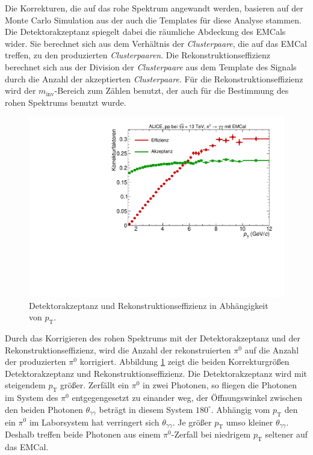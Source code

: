 Die Korrekturen, die auf das rohe Spektrum angewandt werden, basieren auf der Monte Carlo Simulation aus der auch die Templates für diese Analyse stammen.
\newline
Die Detektorakzeptanz spiegelt dabei die räumliche Abdeckung des EMCals wider.
Sie berechnet sich aus dem Verhältnis der \textit{Clusterpaare}, die auf das EMCal treffen, zu den produzierten \textit{Clusterpaaren}.
\newline
Die Rekonstruktionseffizienz berechnet sich aus der Division der \textit{Clusterpaare} aus dem Template des Signals durch die Anzahl der akzeptierten \textit{Clusterpaare}.
Für die Rekonstruktionseffizienz wird der $m_\text{inv}$-Bereich zum Zählen benutzt, der auch für die Bestimmung des rohen Spektrums benutzt wurde.
\begin{figure}[t] %
\centering
\includegraphics[width=.65\linewidth]{Korrekturfaktoren_Data_2016.pdf}
\caption{Detektorakzeptanz und Rekonstruktionseffizienz in Abhängigkeit von $p_\text{T}$.
}
\label{fig:Korrekturen}
\end{figure}
\newline
Durch das Korrigieren des rohen Spektrums mit der Detektorakzeptanz und der Rekonstruktionseffizienz, wird die Anzahl der rekonstruierten $\pi^{0}$ auf die Anzahl der produzierten $\pi^{0}$ korrigiert.
Abbildung \ref{fig:Korrekturen} zeigt die beiden Korrekturgrößen Detektorakzeptanz und Rekonstruktionseffizienz.
\newline
Die Detektorakzeptanz wird mit steigendem $p_\text{T}$ größer.
Zerfällt ein $\pi^{0}$ in zwei Photonen, so fliegen die Photonen im System des $\pi^{0}$ entgegengesetzt zu einander weg, der Öffnungswinkel zwischen den beiden Photonen $\theta_{\gamma\gamma}$ beträgt in diesem System $180^{\circ}$.
Abhängig vom $p_\text{T}$ den ein $\pi^{0}$ im Laborsystem hat verringert sich $\theta_{\gamma\gamma}$.
Je größer $p_\text{T}$ umso kleiner $\theta_{\gamma\gamma}$.
Deshalb treffen beide Photonen aus einem $\pi^{0}$-Zerfall bei niedrigem $p_\text{T}$ seltener auf das EMCal.
